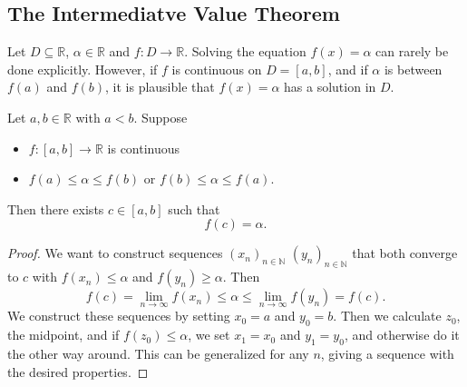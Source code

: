 \subsection{The Intermediatve Value Theorem}

Let $D \subseteq \mathbb{R}$, $\alpha \in \mathbb{R}$ and $f: D \rightarrow \mathbb{R}$. Solving the equation $f(x) = \alpha$ can rarely be done explicitly. However, if $f$ is continuous on $D = [a, b]$, and if $\alpha$ is between $f(a)$ and $f(b)$, it is plausible that $f(x) = \alpha$ has a solution in $D$.

\begin{theorem}
    Let $a, b \in \mathbb{R}$ with $a < b$. Suppose
    \begin{itemize}
      \item $f:[a,b] \rightarrow \mathbb{R}$ is continuous
      \item $f(a) \leq \alpha \leq f(b)$ or $f(b) \leq \alpha \leq f(a)$.
    \end{itemize}

    Then there exists $c \in [a, b]$ such that
    \[f(c) = \alpha.\]
\end{theorem}
\begin{proof}
  We want to construct sequences $(x_n)_{n \in \mathbb{N}}$ $(y_n)_{n \in \mathbb{N}}$ that both converge to $c$ with $f(x_n) \leq \alpha$ and $f(y_n) \geq \alpha$. Then 
  \[f(c) = \lim_{n \rightarrow \infty} f(x_n) \leq \alpha \leq \lim_{n \rightarrow \infty} f(y_n) = f(c).\]
  We construct these sequences by setting $x_0 = a$ and $y_0 = b$. Then we calculate $z_0$, the midpoint, and if $f(z_0) \leq \alpha$, we set $x_1 = x_0$ and $y_1 = y_0$, and otherwise do it the other way around. This can be generalized for any $n$, giving a sequence with the desired properties.
\end{proof}
